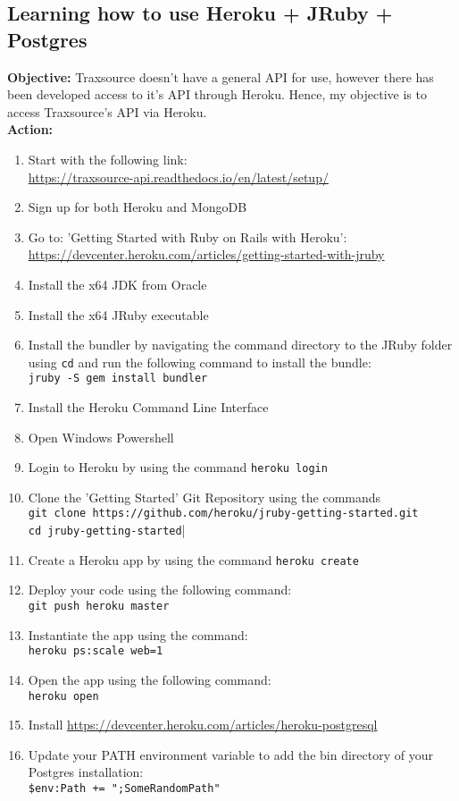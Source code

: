 \documentclass{article}
\begin{document}
\subsection{Learning how to use Heroku + JRuby + Postgres}
\textbf{Objective:} Traxsource doesn't have a general API for use, however there has been developed access to it's API through Heroku. Hence, my objective is to access Traxsource's API via Heroku.\\
\textbf{Action:}
\begin{enumerate}
    \item Start with the following link:\\ \url{https://traxsource-api.readthedocs.io/en/latest/setup/}
    \item Sign up for both Heroku and MongoDB
    \item Go to: 'Getting Started with Ruby on Rails with Heroku':\\
    \url{https://devcenter.heroku.com/articles/getting-started-with-jruby}
    \item Install the x64 JDK from Oracle
    \item Install the x64 JRuby executable
    \item Install the bundler by navigating the command directory to the JRuby folder using \texttt{cd} and run the following command to install the bundle:\\
    \verb|jruby -S gem install bundler|
    \item Install the Heroku Command Line Interface
    \item Open Windows Powershell
    \item Login to Heroku by using the command \texttt{heroku login}
    \item Clone the 'Getting Started' Git Repository using the commands\\
    \texttt{git clone https://github.com/heroku/jruby-getting-started.git}\\
    \verb|cd jruby-getting-started||
    \item Create a Heroku app by using the command \texttt{heroku create}
    \item Deploy your code using the following command:\\
    \verb|git push heroku master|
    \item Instantiate the app using the command: \\
    \verb|heroku ps:scale web=1|
    \item Open the app using the following command:\\
    \verb|heroku open|
    \item Install \hyperlink{PostgreSQL}{https://devcenter.heroku.com/articles/heroku-postgresql}
    \item Update your PATH environment variable to add the bin directory of your Postgres installation:\\
    \verb|$env:Path += ";SomeRandomPath"|
\end{enumerate}
\end{document}
